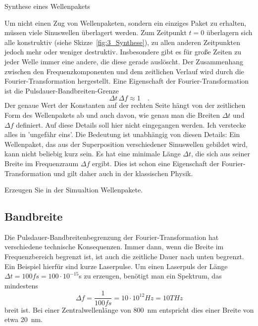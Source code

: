\begin{marginfigure}
    \caption{Synthese eines Wellenpakets}
    \label{fig:3_Synthese}
\end{marginfigure}


Um nicht einen Zug von Wellenpaketen, sondern ein einziges Paket zu erhalten, müssen viele Sinuswellen überlagert werden. Zum Zeitpunkt $t=0$ überlagern sich alle konstruktiv (siehe Skizze~\ref{fig:3_Synthese}), zu allen anderen Zeitpunkten jedoch mehr oder weniger destruktiv. Insbesondere gibt es für große Zeiten zu jeder Welle immer eine andere, die diese gerade auslöscht. Der Zusammenhang zwischen den Frequenzkomponenten und dem zeitlichen Verlauf wird durch die Fourier-Transformation hergestellt. Eine Eigenschaft der Fourier-Transformation ist die Pulsdauer-Bandbreiten-Grenze
\begin{equation}
    \Delta t \, \Delta f \approx 1 \quad .
\end{equation}
Der genaue Wert der Konstanten auf der rechten Seite hängt von der zeitlichen Form des Wellenpakets ab und auch davon, wie genau man die Breiten $\Delta t$ und $\Delta f$ definiert. Auf diese Details soll hier nicht eingegangen werden. Ich verstecke alles in 'ungefähr eins'. Die Bedeutung ist unabhängig von diesen Details: Ein Wellenpaket, das aus der Superposition verschiedener Sinuswellen gebildet wird, kann nicht beliebig kurz sein. Es hat eine minimale Länge $\Delta t$, die sich aus seiner Breite im Frequenzraum $\Delta f$ ergibt. Dies ist schon eine Eigenschaft der Fourier-Transformation und gilt daher auch in der klassischen Physik.


\begin{questions}
    \item Erzeugen Sie in der Simualtion Wellenpakete.
\end{questions}

\subsection{Bandbreite}

Die Pulsdauer-Bandbreitenbegrenzung der Fourier-Transformation hat verschiedene technische Konsequenzen. Immer dann, wenn die Breite im Frequenzbereich begrenzt ist, ist auch die zeitliche Dauer nach unten begrenzt. Ein Beispiel hierfür sind kurze Laserpulse. Um einen Laserpuls der Länge $\Delta t = 100 fs = 100 \cdot 10^{-15}$s zu erzeugen, benötigt man ein Spektrum, das mindestens 
\begin{equation}
    \Delta f = \frac{1}{100 fs} = 10 \cdot 10^{12} Hz = 10 THz
\end{equation}
breit ist. Bei einer Zentralwellenlänge von 800~nm entspricht dies einer Breite von etwa 20~nm.


